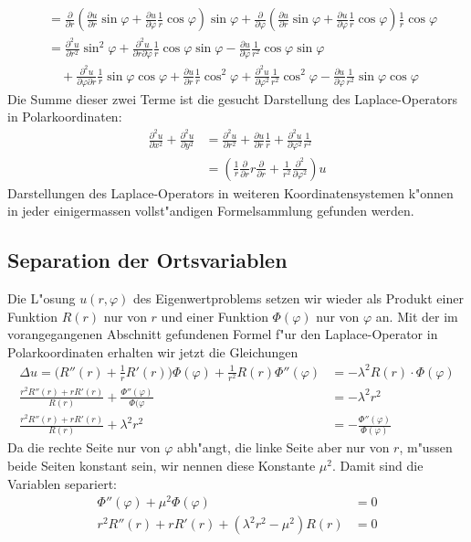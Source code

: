 \begin{align*}
&=
\frac{\partial}{\partial r}
\left(
\frac{\partial u}{\partial r}
\sin\varphi
+
\frac{\partial u}{\partial\varphi}
\frac1r\cos\varphi
\right)
\sin\varphi
+
\frac{\partial}{\partial \varphi}
\left(
\frac{\partial u}{\partial r}
\sin\varphi
+
\frac{\partial u}{\partial\varphi}
\frac1r\cos\varphi
\right)
\frac1r\cos\varphi
\\
&=
\frac{\partial^2u}{\partial r^2}\sin^2\varphi
+\frac{\partial^2u}{\partial r\partial\varphi}\frac1r\cos\varphi\sin\varphi
-\frac{\partial u}{\partial\varphi}\frac1{r^2}\cos\varphi\sin\varphi
\\
&\quad
+
\frac{\partial^2u}{\partial\varphi\partial r}\frac1r\sin\varphi\cos\varphi
+\frac{\partial u}{\partial r}\frac1r\cos^2\varphi
+\frac{\partial^2u}{\partial \varphi^2}\frac1{r^2}\cos^2\varphi
-\frac{\partial u}{\partial \varphi}\frac1{r^2}\sin\varphi\cos\varphi
\end{align*}
Die Summe dieser zwei Terme ist die gesucht Darstellung des Laplace-Operators
in Polarkoordinaten:
\begin{align*}
\frac{\partial^2u}{\partial x^2}+\frac{\partial^2u}{\partial y^2}
&=
\frac{\partial^2u}{\partial r^2}
+\frac{\partial u}{\partial r}\frac1r
+\frac{\partial^2u}{\partial\varphi^2}\frac1{r^2}
\\
&=
\left(\frac1r\frac{\partial}{\partial r}r\frac{\partial}{\partial r}+\frac1{r^2}\frac{\partial^2}{\partial \varphi^2}\right)u
\end{align*}
Darstellungen des Laplace-Operators in weiteren Koordinatensystemen k"onnen
in jeder einigermassen vollst"andigen Formelsammlung gefunden werden.

\subsection{Separation der Ortsvariablen}
Die L"osung $u(r,\varphi)$ des Eigenwertproblems setzen wir wieder
als Produkt einer Funktion
$R(r)$
nur von  $r$ und einer Funktion $\Phi(\varphi)$ nur von $\varphi$ an.
Mit der im vorangegangenen Abschnitt gefundenen Formel f"ur den Laplace-Operator
in Polarkoordinaten erhalten wir jetzt die Gleichungen
\begin{align*}
\Delta u=
\biggl(R''(r) + \frac1rR'(r)\biggr)\Phi(\varphi)
+\frac1{r^2}R(r)\Phi''(\varphi)&=-\lambda^2 R(r)\cdot\Phi(\varphi)\\
\frac{r^2R''(r)+rR'(r)}{R(r)}+\frac{\Phi''(\varphi)}{\Phi(\varphi}
&=-\lambda^2 r^2
\\
\frac{r^2R''(r)+rR'(r)}{R(r)}+\lambda^2 r^2&=-\frac{\Phi''(\varphi)}{\Phi(\varphi)}
\end{align*}
Da die rechte Seite nur von $\varphi$ abh"angt, die linke Seite aber nur von $r$,
m"ussen beide Seiten konstant sein, wir nennen diese Konstante $\mu^2$.
Damit sind die Variablen separiert:
\begin{align}
\Phi''(\varphi)+\mu^2\Phi(\varphi)&=0\label{phigleichung}\\
r^2R''(r)+rR'(r)+(\lambda^2 r^2-\mu^2)R(r)&=0\label{rgleichung}
\end{align}

